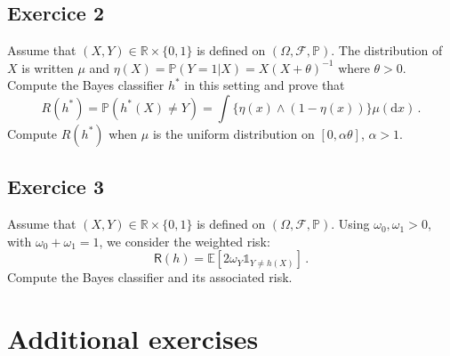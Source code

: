 \documentclass[a4paper,10pt,fleqn]{article}
\newcommand{\rmd}{\mathrm{d}}
\newcommand{\bP}{\mathbb{P}}
\newcommand{\1}{\ensuremath{\mathbbm{1}}}
\newcommand{\bE}{\mathbb{E}}
\begin{document}
\subsection{Exercice 2}
Assume that $(X,Y)\in\mathbb{R}\times\{0,1\}$ is defined on $(\Omega,\mathcal{F},\mathbb{P})$. The distribution of $X$ is written $\mu$ and $\eta(X) = \mathbb{P}(Y=1|X) = X(X+\theta)^{-1}$ where $\theta>0$. Compute the Bayes classifier $h^*$ in this setting and prove that
$$
R(h^*) = \bP(h^*(X)\neq Y) = \int \{\eta(x) \wedge (1-\eta(x))\}\mu(\rmd x)\,.
$$
Compute $R(h^*)$ when $\mu$ is the uniform distribution on $[0,\alpha \theta]$, $\alpha>1$. 

\subsection{Exercice 3}
Assume that $(X,Y)\in\mathbb{R}\times\{0,1\}$ is defined on $(\Omega,\mathcal{F},\mathbb{P})$. Using $\omega_0, \omega_1 >0$, with $\omega_0+\omega_1 = 1$, we  consider the weighted risk:
$$
\mathsf{R}(h) = \bE[2\omega_Y \mathds{1}_{Y\neq h(X)}]\,.
$$
 Compute the Bayes classifier and its associated risk.

\section{Additional exercises}
\end{document}
